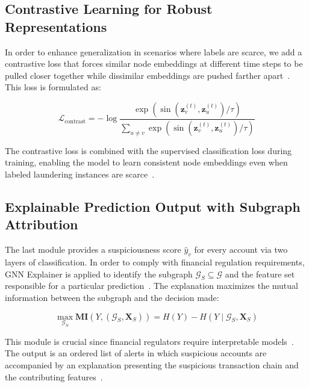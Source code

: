 \documentclass[conference]{IEEEtran}
\begin{document}
\subsection{Contrastive Learning for Robust Representations}
In order to enhance generalization in scenarios where labels are scarce, we add a contrastive loss that forces similar node embeddings at different time steps to be pulled closer together while dissimilar embeddings are pushed farther apart~\cite{alarab2020, altman2023}. This loss is formulated as:

\[
\mathcal{L}_{\mathrm{contrast}} = -\log \frac{\exp(\sin(\mathbf{z}_v^{(t)},\mathbf{z}_u^{(t)}) / \tau)}{\sum_{u\neq v}\exp(\sin(\mathbf{z}_v^{(t)},\mathbf{z}_u^{(t)}) / \tau)}
\]

The contrastive loss is combined with the supervised classification loss during training, enabling the model to learn consistent node embeddings even when labeled laundering instances are scarce~\cite{cheng2023}.


\subsection{Explainable Prediction Output with Subgraph Attribution}
The last module provides a suspiciousness score \(\hat{y}_v\) for every account via two layers of classification. In order to comply with financial regulation requirements, GNN Explainer is applied to identify the subgraph \(\mathcal{G}_S\subseteq \mathcal{G}\) and the feature set responsible for a particular prediction~\cite{kurshan2021, kute2021}. The explanation maximizes the mutual information between the subgraph and the decision made:

\[
\max_{\mathcal{G}_S}\mathbf{M}\mathbf{I}(Y,(\mathcal{G}_S,\mathbf{X}_S)) = H(Y) - H(Y\mid \mathcal{G}_S,\mathbf{X}_S)
\]

This module is crucial since financial regulators require interpretable models~\cite{canhoto2021, kute2021}. The output is an ordered list of alerts in which suspicious accounts are accompanied by an explanation presenting the suspicious transaction chain and the contributing features~\cite{kurshan2021, egressy2024}.
\end{document}
